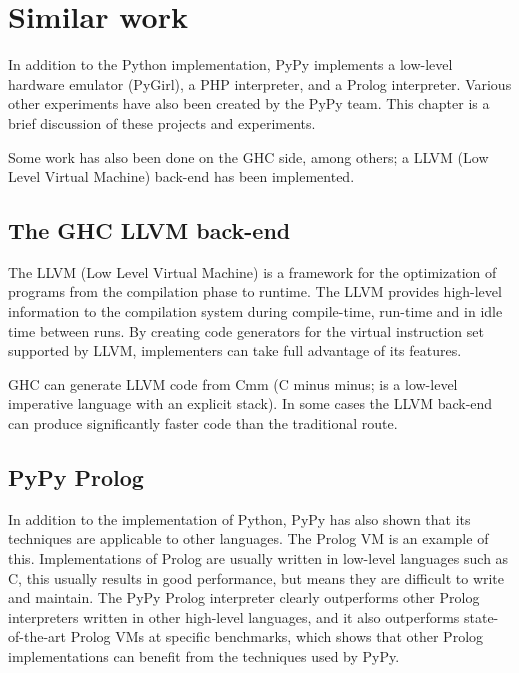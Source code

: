 \chapter{Similar work}
\label{chap:similar}

In addition to the Python implementation, PyPy implements a low-level 
hardware emulator (PyGirl), a PHP interpreter, and a Prolog interpreter. 
Various other experiments have also been created by the PyPy team. This
chapter is a brief discussion of these projects and experiments. 

Some work has also been done on the GHC side, among others; a LLVM
(Low Level Virtual Machine) back-end has been implemented.

\section{The GHC LLVM back-end}

The LLVM (Low Level Virtual Machine) is a framework for the optimization of 
programs from the compilation phase to runtime. The LLVM provides high-level information 
to the compilation system during compile-time, run-time and in idle time between
runs. By creating code generators for the virtual instruction set supported by
LLVM, implementers can take full advantage of its features.
\cite{lattner2004llvm}

GHC can generate LLVM code from Cmm (C minus minus; is a low-level imperative
language with an explicit stack). In some cases the 
LLVM back-end can produce significantly faster code than the traditional route. 
\cite{marlow2012glasgow, terei2010llvm}

\section{PyPy Prolog}

In addition to the implementation of Python, PyPy has also shown that its techniques
are applicable to other languages. The Prolog VM is an example of this. Implementations
of Prolog are usually written in low-level languages such as C, this usually results in
good performance, but means they are difficult to write and maintain. The PyPy Prolog 
interpreter clearly outperforms other Prolog interpreters written in other high-level
languages, and it also outperforms state-of-the-art Prolog VMs at specific benchmarks,
which shows that other Prolog implementations can benefit from the techniques used by
PyPy. \cite{bolz2010towards}

